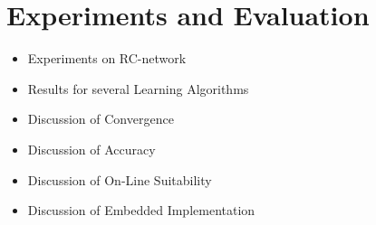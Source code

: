  
\chapter{Experiments and Evaluation}
\label{ch:experiments}

\begin{itemize}
\item{Experiments on RC-network}
\item{Results for several Learning Algorithms}
\item{Discussion of Convergence}
\item{Discussion of Accuracy}
\item{Discussion of On-Line Suitability}
\item{Discussion of Embedded Implementation}
\end{itemize}
